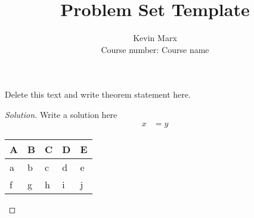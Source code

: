 \documentclass[12pt]{article}
\newenvironment{problem}[2][Problem]{\begin{trivlist}
\item[\hskip \labelsep {\bfseries #1}\hskip \labelsep {\bfseries #2.}]}{\end{trivlist}}
\begin{document}
 
\title{Problem Set Template}
\author{Kevin Marx\\
Course number: Course name}
\maketitle
 
\begin{problem}{1.1}
Delete this text and write theorem statement here.
\end{problem}

\begin{proof}[Solution]
Write a solution here
\begin{align*}
x &= y
\end{align*}
\begin{tabular}{| >{\centering\arraybackslash}m{1in} | >{\centering\arraybackslash}m{1in} | >{\centering\arraybackslash}m{1in} | >{\centering\arraybackslash}m{1in} |>{\centering\arraybackslash}m{1in} |}
\hline 
  \textbf{A} & \textbf{B} & \textbf{C} & \textbf{D} &\textbf{E} \\[8pt]
  \hline
  a & b & c & d & e \\[8pt]
  \hline
  f & g &h & i & j \\[8pt]
  \hline
\end{tabular}
\end{proof}
\end{document}
